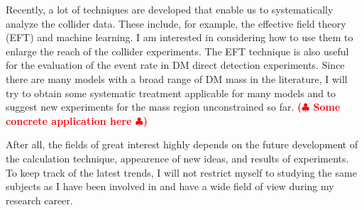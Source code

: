 \documentclass[12pt,notitlepage]{article}
\def\rem#1{ {\bf\textcolor{red}{($\clubsuit$ #1 $\clubsuit$)}}}
\begin{document}
Recently, a lot of techniques are developed that enable us to systematically analyze the collider data.
These include, for example, the effective field theory (EFT) and machine learning.
I am interested in considering how to use them to enlarge the reach of the collider experiments.
The EFT technique is also useful for the evaluation of the event rate in DM direct detection experiments.
Since there are many models with a broad range of DM mass in the literature, I will try to obtain some systematic treatment applicable for many models and to suggest new experiments for the mass region unconstrained so far.
\rem{Some concrete application here}

After all, the fields of great interest highly depends on the future development of the calculation technique, appearence of new ideas, and results of experiments.
To keep track of the latest trends, I will not restrict myself to studying the same subjects as I have been involved in and have a wide field of view during my research career.
\end{document}
